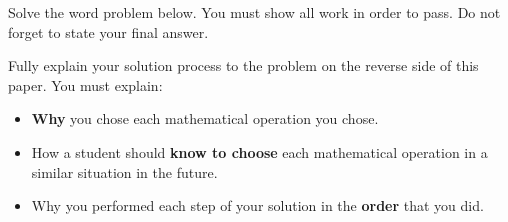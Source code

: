 
Solve the word problem below. You must show all work in order to pass. Do not forget to state your final answer.

\begin{statement}
\end{statement}

\begin{ansenv}
\end{ansenv}

\newpage
{}

Fully explain your solution process to the problem on the reverse side of this paper. You must explain:
\begin{itemize}
    \item \textbf{Why} you chose each mathematical operation you chose.
    \item How a student should \textbf{know to choose} each mathematical operation in a similar situation in the future.
    \item Why you performed each step of your solution in the \textbf{order} that you did.
\end{itemize}